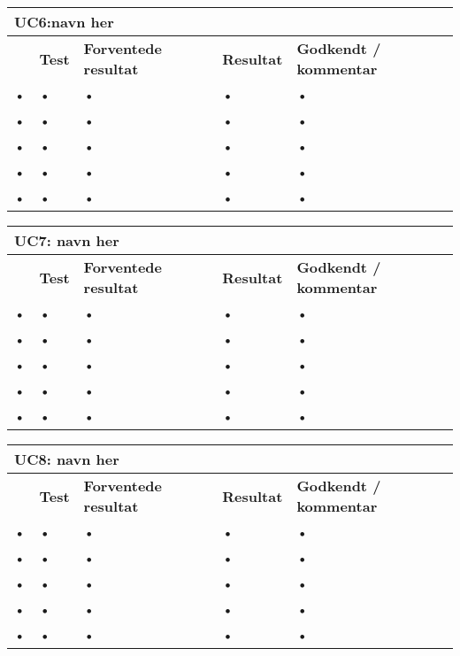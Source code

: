 \begin{longtable}{|p{5mm}|p{40mm}|p{40mm}|p{20mm}|p{25mm}|}
\hline 
\multicolumn{5}{|l|}{\textbf{UC6:navn her}} \\ 
\hline 
& \textbf{Test} & \textbf{Forventede resultat} & \textbf{Resultat} & \textbf{Godkendt / kommentar} \\ 
\hline 
• & • & • & • & • \\ 
\hline 
• & • & • & • & • \\ 
\hline 
• & • & • & • & • \\ 
\hline 
• & • & • & • & • \\ 
\hline 
• & • & • & • & • \\ 
\hline 
\end{longtable} 

\begin{longtable}{|p{5mm}|p{40mm}|p{40mm}|p{20mm}|p{25mm}|}
\hline 
\multicolumn{5}{|l|}{\textbf{UC7: navn her}} \\ 
\hline 
& \textbf{Test} & \textbf{Forventede resultat} & \textbf{Resultat} & \textbf{Godkendt / kommentar} \\ 
\hline 
• & • & • & • & • \\ 
\hline 
• & • & • & • & • \\ 
\hline 
• & • & • & • & • \\ 
\hline 
• & • & • & • & • \\ 
\hline 
• & • & • & • & • \\ 
\hline 
\end{longtable} 

\begin{longtable}{|p{5mm}|p{40mm}|p{40mm}|p{20mm}|p{25mm}|}
\hline 
\multicolumn{5}{|l|}{\textbf{UC8: navn her}} \\ 
\hline 
& \textbf{Test}&\textbf{Forventede resultat}& \textbf{Resultat} & \textbf{Godkendt / kommentar} \\ 
\hline 
• & • & • & • & • \\ 
\hline 
• & • & • & • & • \\ 
\hline 
• & • & • & • & • \\ 
\hline 
• & • & • & • & • \\ 
\hline 
• & • & • & • & • \\ 
\hline 
\end{longtable} 